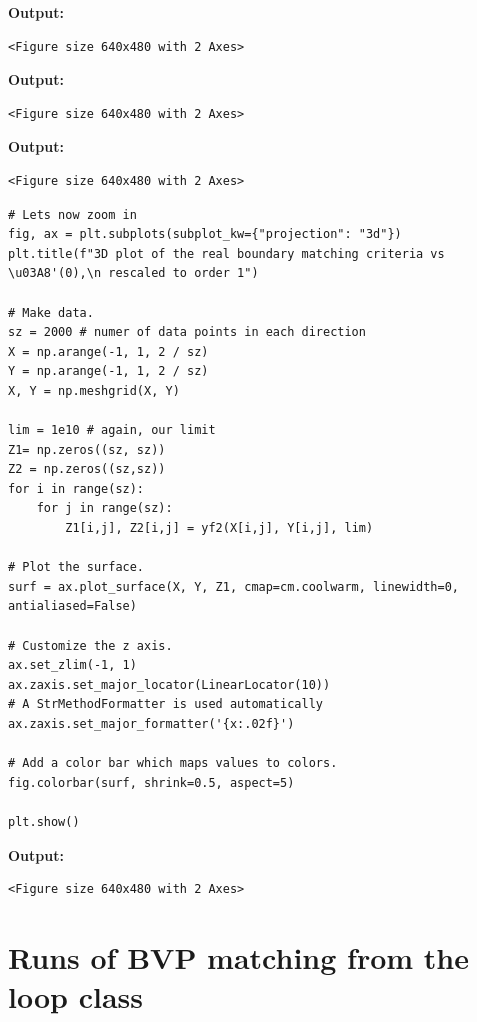 \documentclass{article}
\begin{document}
\textbf{Output:}\begin{verbatim}
<Figure size 640x480 with 2 Axes>
\end{verbatim}

\textbf{Output:}\begin{verbatim}
<Figure size 640x480 with 2 Axes>
\end{verbatim}

\textbf{Output:}\begin{verbatim}
<Figure size 640x480 with 2 Axes>
\end{verbatim}

\begin{lstlisting}
# Lets now zoom in
fig, ax = plt.subplots(subplot_kw={"projection": "3d"})
plt.title(f"3D plot of the real boundary matching criteria vs \u03A8'(0),\n rescaled to order 1")

# Make data.
sz = 2000 # numer of data points in each direction
X = np.arange(-1, 1, 2 / sz)
Y = np.arange(-1, 1, 2 / sz)
X, Y = np.meshgrid(X, Y)

lim = 1e10 # again, our limit
Z1= np.zeros((sz, sz))
Z2 = np.zeros((sz,sz))
for i in range(sz):
    for j in range(sz):
        Z1[i,j], Z2[i,j] = yf2(X[i,j], Y[i,j], lim)

# Plot the surface.
surf = ax.plot_surface(X, Y, Z1, cmap=cm.coolwarm, linewidth=0, antialiased=False)

# Customize the z axis.
ax.set_zlim(-1, 1)
ax.zaxis.set_major_locator(LinearLocator(10))
# A StrMethodFormatter is used automatically
ax.zaxis.set_major_formatter('{x:.02f}')

# Add a color bar which maps values to colors.
fig.colorbar(surf, shrink=0.5, aspect=5)

plt.show()\end{lstlisting}

\textbf{Output:}\begin{verbatim}
<Figure size 640x480 with 2 Axes>
\end{verbatim}

\section{Runs of BVP matching from the loop class}
\end{document}

